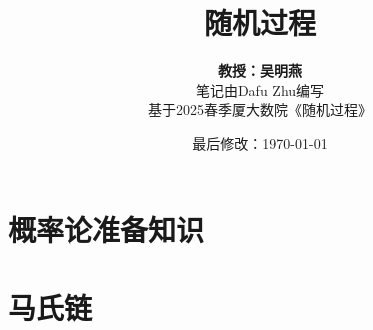 \documentclass{article}
\title{随机过程}
\author{\textbf{教授：吴明燕} \\ 笔记由Dafu Zhu编写 \\ 基于2025春季厦大数院《随机过程》}
\date{最后修改：\today}
\begin{document}
\maketitle

\tableofcontents

\pagebreak

\section{概率论准备知识}


\pagebreak

\section{马氏链}









\pagebreak

%




\end{document}
